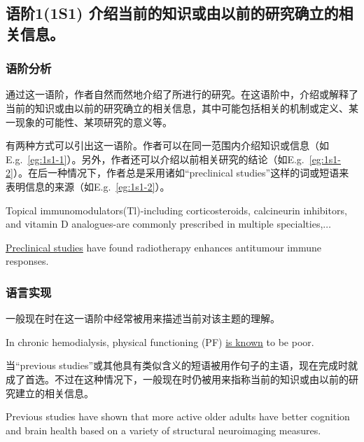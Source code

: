 \documentclass[a4paper]{ctexbook}
\begin{document}
  \subsection{语阶1(1S1) 介绍当前的知识或由以前的研究确立的相关信息。}

    \subsubsection{语阶分析}

    通过这一语阶，作者自然而然地介绍了所进行的研究。在这语阶中，介绍或解释了当前的知识或由以前的研究确立的相关信息，其中可能包括相关的机制或定义、某一现象的可能性、某项研究的意义等。

    有两种方式可以引出这一语阶。作者可以在同一范围内介绍知识或信息（如E.g.~\ref{eg:1s1-1}）。另外，作者还可以介绍以前相关研究的结论（如E.g.~\ref{eg:1s1-2}）。在后一种情况下，作者总是采用诸如“preclinical studies”这样的词或短语来表明信息的来源（如E.g.~\ref{eg:1s1-2}）。
    
    \begin{eg}[label={eg:1s1-1}]{}
      Topical immunomodulators(Tl)-including corticosteroids, calcineurin inhibitors, and vitamin D analogues-are commonly prescribed in multiple specialties,$\dots$
    \end{eg}

    \begin{eg}[label={eg:1s1-2}]{}
      \uline{Preclinical studies} have found radiotherapy enhances antitumour immune responses.
    \end{eg}

    \subsubsection{语言实现}

    一般现在时在这一语阶中经常被用来描述当前对该主题的理解。

    \begin{eg}[label={myautocounter}]{}
      In chronic hemodialysis, physical functioning (PF) \uline{is known} to be poor.
    \end{eg}

    当“previous studies”或其他具有类似含义的短语被用作句子的主语，现在完成时就成了首选。不过在这种情况下，一般现在时仍被用来指称当前的知识或由以前的研究建立的相关信息。

    \begin{eg}[label={myautocounter}]{}
      Previous studies have shown that more active older adults have better cognition and brain health based on a variety of structural neuroimaging measures.
    \end{eg}
\end{document}
